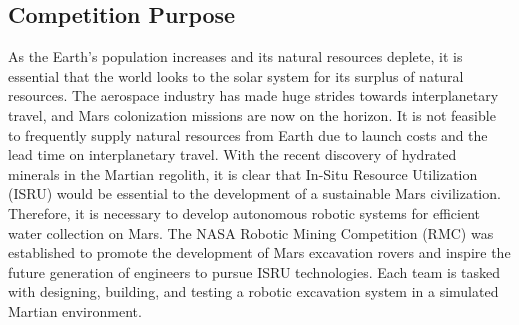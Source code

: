 \documentclass[class=article, crop=false]{standalone}
\begin{document}
	\subsection{Competition Purpose}
	\label{subsec:competition_purpose}
	
	
As the Earth’s population increases and its natural resources deplete, it is essential that the world looks to the solar system for its surplus of natural resources. The aerospace industry has made huge strides towards interplanetary travel, and Mars colonization missions are now on the horizon. It is not feasible to frequently supply natural resources from Earth due to launch costs and the lead time on interplanetary travel. With the recent discovery of hydrated minerals in the Martian regolith, it is clear that In-Situ Resource Utilization (ISRU) would be essential to the development of a sustainable Mars civilization. Therefore, it is necessary to develop autonomous robotic systems for efficient water collection on Mars. The NASA Robotic Mining Competition (RMC) was established to promote the development of Mars excavation rovers and inspire the future generation of engineers to pursue ISRU technologies. Each team is tasked with designing, building, and testing a robotic excavation system in a simulated Martian environment. 
	
	
\end{document}

